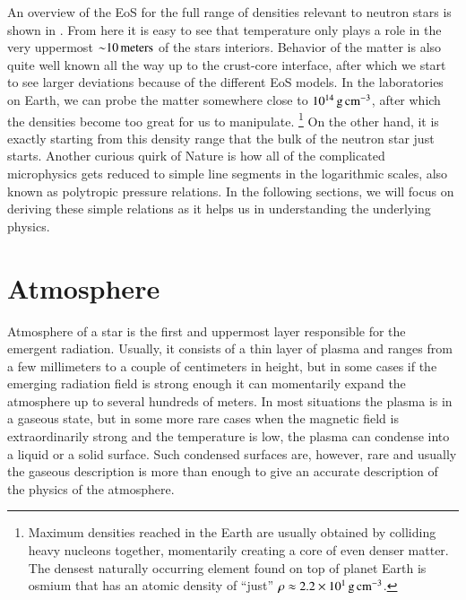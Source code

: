 An overview of the EoS for the full range of densities relevant to neutron stars is shown in .
From here it is easy to see that temperature only plays a role in the very uppermost $\mathord{\sim} 10\,\mathrm{meters}$ of the stars interiors.
Behavior of the matter is also quite well known all the way up to the crust-core interface, after which we start to see larger deviations because of the different EoS models.
In the laboratories on Earth, we can probe the matter somewhere close to $10^{14} \, \mathrm{g}\,\mathrm{cm}^{-3}$, after which the densities become too great for us to manipulate.%
\footnote{Maximum densities reached in the Earth are usually obtained by colliding heavy nucleons together, momentarily creating a core of even denser matter.
The densest naturally occurring element found on top of planet Earth is osmium that has an atomic density of ``just'' $\rho \approx 2.2 \times 10^{1}\, \mathrm{g}\,\mathrm{cm}^{-3}$.
}
On the other hand, it is exactly starting from this density range that the bulk of the neutron star just starts.
Another curious quirk of Nature is how all of the complicated microphysics gets reduced to simple line segments in the logarithmic scales, also known as polytropic pressure relations.
In the following sections, we will focus on deriving these simple relations as it helps us in understanding the underlying physics.

\section{Atmosphere}\label{sect:atmos}

Atmosphere of a star is the first and uppermost layer responsible for the emergent radiation.
Usually, it consists of a thin layer of plasma and ranges from a few millimeters to a couple of centimeters in height, but in some cases if the emerging radiation field is strong enough it can momentarily expand the atmosphere up to several hundreds of meters.
In most situations the plasma is in a gaseous state, but in some more rare cases when the magnetic field is extraordinarily strong and the temperature is low, the plasma can condense into a liquid or a solid surface.
Such condensed surfaces are, however, rare and usually the gaseous description is more than enough to give an accurate description of the physics of the atmosphere.\cite[see e.g.,][for a review]{ZP02, Potekhin14}

